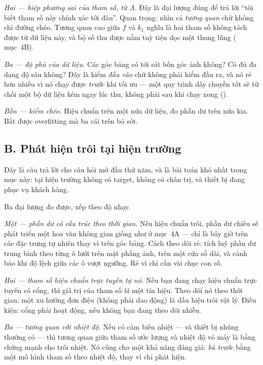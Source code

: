 \documentclass[../../vslam.tex]{subfiles}
\begin{document}
\emph{Hai --- hiệp phương sai của tham số, từ \(\Lambda\).} Đây là đại lượng đúng để trả lời ``tôi biết tham số này chính xác tới đâu''. Quan trọng: nhìn cả \emph{tương quan} chứ không chỉ đường chéo. Tương quan cao giữa \(f\) và \(k_1\) nghĩa là hai tham số không tách được từ dữ liệu này, và bộ số thu được nằm tuỳ tiện dọc một thung lũng ( mục~4B).

\emph{Ba --- độ phủ của dữ liệu.} Các góc bảng có tới sát bốn góc ảnh không? Có đủ đa dạng độ sâu không? Đây là kiểm \emph{đầu vào} chứ không phải kiểm đầu ra, và nó rẻ hơn nhiều vì nó chạy được \emph{trước} khi tối ưu --- một quy trình dây chuyền tốt sẽ từ chối một bộ dữ liệu kém ngay lúc thu, không phải sau khi chạy xong ().

\emph{Bốn --- kiểm chéo.} Hiệu chuẩn trên một nửa dữ liệu, đo phần dư trên nửa kia. Bắt được overfitting mà ba cái trên bỏ sót.

\subsection{B. Phát hiện trôi tại hiện trường}

Đây là câu trả lời cho câu hỏi mở đầu thứ năm, và là bài toán khó nhất trong mục này: tại hiện trường không có target, không có chân trị, và thiết bị đang phục vụ khách hàng.

Ba đại lượng đo được, xếp theo độ nhạy.

\emph{Một --- phần dư có cấu trúc theo thời gian.} Nếu hiệu chuẩn trôi, phần dư chiếu sẽ phát triển một hoa văn không gian giống như ở  mục~4A --- chỉ là bây giờ trên các đặc trưng tự nhiên thay vì trên góc bảng. Cách theo dõi rẻ: tích luỹ phần dư trung bình theo từng ô lưới trên mặt phẳng ảnh, trên một cửa sổ dài, và cảnh báo khi độ lệch giữa các ô vượt ngưỡng. Rẻ vì chỉ cần vài chục con số.

\emph{Hai --- tham số hiệu chuẩn trực tuyến tự nó.} Nếu bạn đang chạy hiệu chuẩn trực tuyến có cổng, thì giá trị của tham số \emph{là} một tín hiệu. Theo dõi nó theo thời gian; một xu hướng đơn điệu (không phải dao động) là dấu hiệu trôi vật lý. Điều kiện: cổng phải hoạt động, nếu không bạn đang theo dõi nhiễu.

\emph{Ba --- tương quan với nhiệt độ.} Nếu có cảm biến nhiệt --- và thiết bị nhúng thường có --- thì tương quan giữa tham số ước lượng và nhiệt độ vỏ máy là bằng chứng mạnh cho trôi nhiệt. Nó cũng cho một khả năng đáng giá: \emph{bù trước} bằng một mô hình tham số theo nhiệt độ, thay vì chỉ phát hiện.
\end{document}
